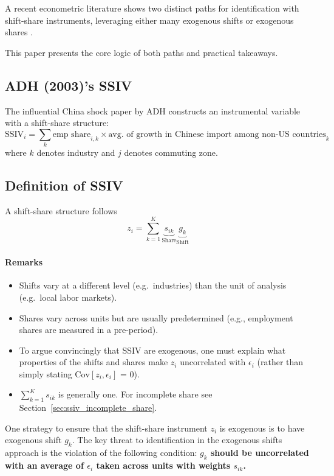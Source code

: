 A recent econometric literature shows two distinct paths for identification with shift-share instruments, 
leveraging either many exogenous shifts \citep{Borusyak:2022, Adao:2019} 
or exogenous shares \citep{Goldsmith-Pinkham:2020}. 

This paper presents the core logic of both paths and practical takeaways.


\subsection{ADH (2003)'s SSIV}
The influential China shock paper by ADH 
constructs an instrumental variable with a shift-share structure:
\begin{equation}
    \text{SSIV}_{i} = \sum_{k} \text{emp share}_{i,k} \times \text{avg. of growth in Chinese import among non-US countries}_{k}
\end{equation}
where $k$ denotes industry and $j$ denotes commuting zone.

\subsection{Definition of SSIV}
A shift-share structure follows
\begin{equation}
    z_i = \sum_{k=1}^K \underbrace{s_{ik}}_{\text{Share}} 
        \underbrace{g_k}_{\text{Shift}}
\end{equation}
\paragraph{Remarks}
\begin{itemize}
    \item Shifts vary at a different level (e.g.~industries) than the unit of analysis (e.g.~local labor markets).
    \item Shares vary across units but are usually predetermined (e.g., employment shares are measured in a pre-period).
    \item To argue convincingly that SSIV are exogenous, 
    one must explain what properties of the shifts and shares make $z_i$ uncorrelated with $\epsilon_i$ 
    (rather than simply stating $\text{Cov}[z_i, \epsilon_i]$ = 0).
    \item $\sum_{k=1}^K s_{ik}$ is generally one. For incomplete share see Section~\ref{sec:ssiv_incomplete_share}.
\end{itemize}

One strategy to ensure that the shift-share instrument $z_i$ is exogenous is to have exogenous shift $g_k$.
The key threat to identification in the exogenous shifts approach is the violation of the following condition:
\textbf{
    $g_k$ should be uncorrelated with an average of $\epsilon_i$ taken across units with weights $s_{ik}$.
}

